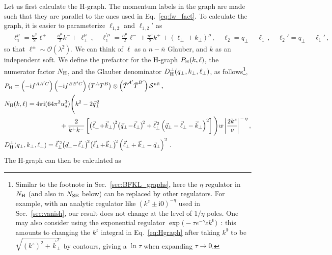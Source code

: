 \documentclass[letterpaper,11pt]{article}
\def\cS{\mathcal{S}}
\newcommand{\eq}[1]{Eq.~\eqref{eq:#1}}
\renewcommand{\sec}[1]{Sec.~\ref{sec:#1}}
\newcommand{\img}{\mathrm{i}}
\newcommand{\cO}{\mathcal{O}}
\newcommand{\as}{\alpha_s}
\newcommand{\nn}{\nonumber}
\newcommand\prp[1]{\vec #1_\perp}
\newcommand\prpsqm[2]{\bigl( \prp{#1} \!-\! \prp{#2} \bigr)^{\!2}}
\newcommand\prpsqp[2]{\bigl( \prp{#1} \!+\! \prp{#2} \bigr)^{\!2}}
\newcommand\prnth[1]{\left(#1\right)}
\newcommand\reg[2]{\left| \frac{2 #1^z}{\nu} \right|^{-#2\eta}}
\newcommand{\bn}{{\bar n}}
\newcommand{\bT}{{\bar T}}
\begin{document}
Let us first calculate the H-graph.
The momentum labels in the graph are made such that they are parallel to the ones used in \eq{fw_fact}. To calculate the graph, it is easier to parameterize $\ell_{1,2}$ and $\ell_{1,2}'$ as
\begin{align}
  &\ell_1^\mu=\frac{n^\mu}{2}\ell^+ -\frac{\bn^\mu}{2}k^-+\ell_\perp^\mu\,,
  \quad
  \ell_1^{\prime\mu}=\frac{\bn^\mu}{2}\ell^- + \frac{n^\mu}{2}k^+ +(\ell_\perp+k_\perp)^\mu\,,
  \quad
  \ell_2=q_\perp-\ell_1\,,\quad
  \ell_2' =q_\perp-\ell_1'\,,
\end{align}
so that $\ell^\pm\sim\cO(\lambda^2)$. We can think of $\ell$ as a $n-\bn$ Glauber, and $k$ as an independent soft.
We define the prefactor for the H-graph $P_{\rm H}(k,\ell)$, the numerator factor $N_{\rm H}$, and the Glauber denominator $D_{\rm H}^\perp(q_\perp, k_\perp,\ell_\perp)$, as follows\footnote{Similar to the footnote in \sec{BFKL_graphs}, here the $\eta$ regulator in $N_{\rm H}$ (and also in $N_{\rm SE}$ below) can be replaced by other regulators. For example, with an analytic regulator like $(k^z\pm\img0)^{-\eta}$ used in \sec{vanish}, our result does not change at the level of $1/\eta$ poles. One may also consider using the exponential regulator $\exp{\bigl(-\tau e^{-\gamma_E}k^0\bigr)}$~\cite{Li:2016axz}: 
this amounts to changing the $k^z$ integral in \eq{Hgraph} after taking $k^0$ to be $\sqrt{(k^z)^2+\vec k_\perp^2}$ by contours, giving a $\ln\tau$ when expanding $\tau\to0$.
},
%
\begin{align}
  &P_{\rm H} = \prnth{-\img f^{AA'C}}\prnth{-\img f^{BB'C}} \prnth{T^{A} T^B} \otimes  \prnth{\bT^{A'} \bT^{B'}} \cS^{n\bn}\,,
\nn \\
&N_\text{H}(k,\ell) = 4\pi \img (64 \pi^2 \as^3)\Bigg(k^2 - 2 \vec q_\perp^{\,2} \nn \\
    & \hspace{1.2in} + \frac{2}{k^+ k^-} \left[ \prpsqp{\ell}{k} \prpsqm{q}{\ell} + \vec\ell_\perp^{\,2} \left(\prp{q} - \prp{\ell} - \prp{k} \right)^2 \right] \Bigg) w\reg{k}\,,
\nn \\
&D_\text{H}^\perp(q_\perp, k_\perp,\ell_\perp) = \vec\ell_\perp^{\;2} \prpsqm{q}{\ell} \prpsqp{\ell}{k} \left(\prp{\ell} + \prp{k} - \prp{q}  \right)^2 \, .
\end{align}
The H-graph can then be calculated as
%
\end{document}
